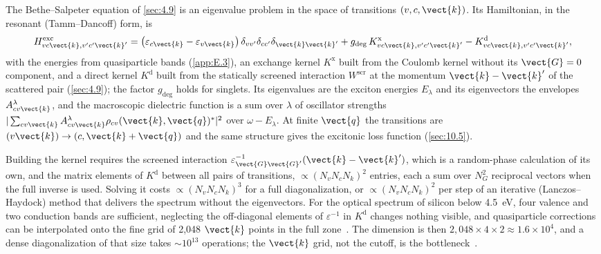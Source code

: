 The Bethe--Salpeter equation of \cref{sec:4.9} is an eigenvalue problem in the space of transitions $(v,c,\vect{k})$. Its Hamiltonian, in the resonant (Tamm--Dancoff) form, is
\begin{equation}
  H^{\mathrm{exc}}_{vc\vect{k},v'c'\vect{k}'} = \bigl(\varepsilon_{c\vect{k}} - \varepsilon_{v\vect{k}}\bigr)\,\delta_{vv'}\delta_{cc'}\delta_{\vect{k}\vect{k}'}
  + g_{\mathrm{deg}}\,K^{\mathrm{x}}_{vc\vect{k},v'c'\vect{k}'} - K^{\mathrm{d}}_{vc\vect{k},v'c'\vect{k}'} ,
  \label{eq:E.6-Hexc}
\end{equation}
with the energies from quasiparticle bands (\cref{app:E.3}), an exchange kernel $K^{\mathrm{x}}$ built from the Coulomb kernel without its $\vect{G} = 0$ component, and a direct kernel $K^{\mathrm{d}}$ built from the statically screened interaction $W^{\mathrm{scr}}$ at the momentum $\vect{k} - \vect{k}'$ of the scattered pair (\cref{sec:4.9}); the factor $g_{\mathrm{deg}}$ holds for singlets. Its eigenvalues are the exciton energies $E_\lambda$ and its eigenvectors the envelopes $A^\lambda_{cv\vect{k}}$, and the macroscopic dielectric function is a sum over $\lambda$ of oscillator strengths $|\sum_{cv\vect{k}}A^\lambda_{cv\vect{k}}\rho_{cv}(\vect{k},\vect{q})^*|^2$ over $\omega - E_\lambda$. At finite $\vect{q}$ the transitions are $(v\vect{k}) \to (c,\vect{k}+\vect{q})$ and the same structure gives the excitonic loss function (\cref{sec:10.5}).

Building the kernel requires the screened interaction $\varepsilon^{-1}_{\vect{G}\vect{G}'}(\vect{k}-\vect{k}')$, which is a random-phase calculation of its own, and the matrix elements of $K^{\mathrm{d}}$ between all pairs of transitions, $\propto (N_vN_cN_k)^2$ entries, each a sum over $N_G^2$ reciprocal vectors when the full inverse is used. Solving it costs $\propto (N_vN_cN_k)^3$ for a full diagonalization, or $\propto (N_vN_cN_k)^2$ per step of an iterative (Lanczos--Haydock) method that delivers the spectrum without the eigenvectors. For the optical spectrum of silicon below \SI{4.5}{eV}, four valence and two conduction bands are sufficient, neglecting the off-diagonal elements of $\varepsilon^{-1}$ in $K^{\mathrm{d}}$ changes nothing visible, and quasiparticle corrections can be interpolated onto the fine grid of 2{,}048 $\vect{k}$ points in the full zone~\cite{albrecht1998ab}. The dimension is then $2{,}048\times4\times2 \approx 1.6\times10^4$, and a dense diagonalization of that size takes $\sim 10^{13}$ operations; the $\vect{k}$ grid, not the cutoff, is the bottleneck~\cite{albrecht1998ab}.

